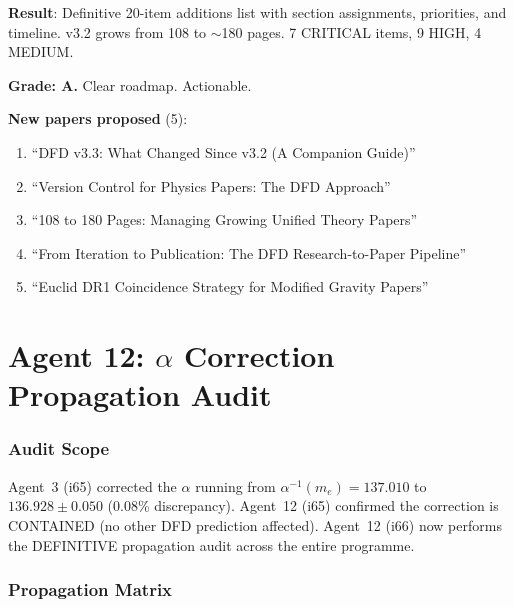 \documentclass[11pt,a4paper]{article}
\begin{document}
\begin{tcolorbox}[colback=green!5!white, colframe=green!60!black, title={Agent 11: v3.3 Additions List COMPLETE}]
\textbf{Result}: Definitive 20-item additions list with section assignments, priorities, and timeline. v3.2 grows from 108 to $\sim$180 pages. 7 CRITICAL items, 9 HIGH, 4 MEDIUM.

\textbf{Grade: A.} Clear roadmap. Actionable.

\textbf{New papers proposed} (5):
\begin{enumerate}
\item ``DFD v3.3: What Changed Since v3.2 (A Companion Guide)''
\item ``Version Control for Physics Papers: The DFD Approach''
\item ``108 to 180 Pages: Managing Growing Unified Theory Papers''
\item ``From Iteration to Publication: The DFD Research-to-Paper Pipeline''
\item ``Euclid DR1 Coincidence Strategy for Modified Gravity Papers''
\end{enumerate}
\end{tcolorbox}


\part{Agent 12: $\alpha$ Correction Propagation Audit}
\label{part:alpha-propagation}

\section{Audit Scope}

Agent~3 (i65) corrected the $\alpha$ running from $\alpha^{-1}(m_e) = 137.010$ to $136.928 \pm 0.050$ (0.08\% discrepancy). Agent~12 (i65) confirmed the correction is CONTAINED (no other DFD prediction affected). Agent~12 (i66) now performs the DEFINITIVE propagation audit across the entire programme.

\section{Propagation Matrix}
\end{document}
